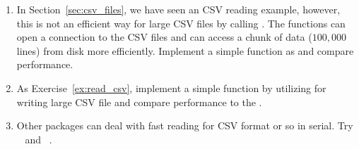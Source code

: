 \begin{enumerate}[label=\thechapter-\arabic*]
\item \label{ex:read_csv}
In Section~\ref{sec:csv_files}, we have seen an CSV reading example, however,
this is not an efficient way for large CSV files by calling .
The  functions  can open a connection to
the CSV files and  can access a chunk of
data ($100,000$ lines)
from disk more efficiently. Implement a simple function as 
and compare performance.

\item
As Exercise~\ref{ex:read_csv}, implement a simple function by utilizing
 for writing large CSV file and compare performance
to the .

\item
Other  packages can deal with fast reading for CSV format or so
in serial. Try ~\citep{ff} and
~\citep{bigmemory}.
 

\end{enumerate}
